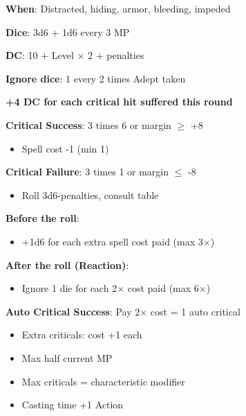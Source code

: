 \documentclass[10pt,a4paper,landscape]{article}
\begin{document}
\begin{multicols}{3}
		\begin{tcolorbox}[title=MAGIC CHECK,colback=criticalcolor!10!white]
			\textbf{When}: Distracted, hiding, armor, bleeding, impeded
			
			\textbf{Dice}: 3d6 + 1d6 every 3 MP
			
			\textbf{DC}: 10 + Level $\times$ 2 + penalties
			
			\textbf{Ignore dice}: 1 every 2 times Adept taken
			
			\textbf{+4 DC for each critical hit suffered this round}
			
			\textcolor{successcolor}{\textbf{Critical Success}}: 3 times 6 or margin $\geq$ +8
			\begin{itemize}[leftmargin=*,noitemsep]
				\item Spell cost -1 (min 1)
			\end{itemize}
			
			\textcolor{criticalcolor}{\textbf{Critical Failure}}: 3 times 1 or margin $\leq$ -8
			\begin{itemize}[leftmargin=*,noitemsep]
				\item Roll 3d6-penalties, consult table
			\end{itemize}
		\end{tcolorbox}
		
		\begin{tcolorbox}[title=ENHANCING MAGIC CHECKS]
			\textbf{Before the roll}:
			\begin{itemize}[leftmargin=*,noitemsep]
				\item +1d6 for each extra spell cost paid (max 3$\times$)
			\end{itemize}
			
			\textbf{After the roll (Reaction)}:
			\begin{itemize}[leftmargin=*,noitemsep]
				\item Ignore 1 die for each 2$\times$ cost paid (max 6$\times$)
			\end{itemize}
			
			\textbf{Auto Critical Success}: Pay 2$\times$ cost = 1 auto critical
			\begin{itemize}[leftmargin=*,noitemsep]
				\item Extra criticals: cost +1 each
				\item Max half current MP
				\item Max criticals = characteristic modifier
				\item Casting time +1 Action
			\end{itemize}
		\end{tcolorbox}
		

\end{multicols}
\end{document}
